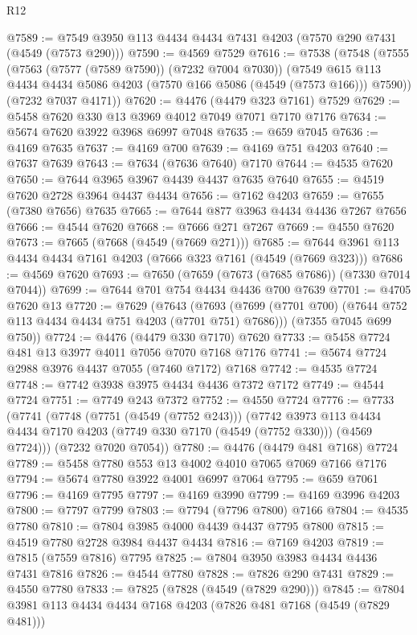 \begin{lexlean}{R12}
\begin{coremodule}
@7589 := @7549 @3950 @113 @4434 @4434 @7431 @4203 (@7570 @290 @7431 (@4549 (@7573 @290)))
@7590 := @4569 @7529
@7616 := @7538
    (@7548
      (@7555
        (@7563 (@7577 (@7589 @7590)) (@7232 @7004 @7030))
        (@7549 @615 @113 @4434 @4434 @5086 @4203 (@7570 @166 @5086 (@4549 (@7573 @166))) @7590))
      (@7232 @7037 @4171))
@7620 := @4476 (@4479 @323 @7161) @7529
@7629 := @5458 @7620 @330 @13 @3969 @4012 @7049 @7071 @7170 @7176
@7634 := @5674 @7620 @3922 @3968 @6997 @7048
@7635 := @659 @7045
@7636 := @4169 @7635
@7637 := @4169 @700
@7639 := @4169 @751 @4203
@7640 := @7637 @7639
@7643 := @7634 (@7636 @7640) @7170
@7644 := @4535 @7620
@7650 := @7644 @3965 @3967 @4439 @4437 @7635 @7640
@7655 := @4519 @7620 @2728 @3964 @4437 @4434
@7656 := @7162 @4203
@7659 := @7655 (@7380 @7656) @7635
@7665 := @7644 @877 @3963 @4434 @4436 @7267 @7656
@7666 := @4544 @7620
@7668 := @7666 @271 @7267
@7669 := @4550 @7620
@7673 := @7665 (@7668 (@4549 (@7669 @271)))
@7685 := @7644 @3961 @113 @4434 @4434 @7161 @4203 (@7666 @323 @7161 (@4549 (@7669 @323)))
@7686 := @4569 @7620
@7693 := @7650 (@7659 (@7673 (@7685 @7686)) (@7330 @7014 @7044))
@7699 := @7644 @701 @754 @4434 @4436 @700 @7639
@7701 := @4705 @7620 @13
@7720 := @7629
    (@7643
      (@7693 (@7699 (@7701 @700) (@7644 @752 @113 @4434 @4434 @751 @4203 (@7701 @751) @7686)))
      (@7355 @7045 @699 @750))
@7724 := @4476 (@4479 @330 @7170) @7620
@7733 := @5458 @7724 @481 @13 @3977 @4011 @7056 @7070 @7168 @7176
@7741 := @5674 @7724 @2988 @3976 @4437 @7055 (@7460 @7172) @7168
@7742 := @4535 @7724
@7748 := @7742 @3938 @3975 @4434 @4436 @7372 @7172
@7749 := @4544 @7724
@7751 := @7749 @243 @7372
@7752 := @4550 @7724
@7776 := @7733
    (@7741
      (@7748
        (@7751 (@4549 (@7752 @243)))
        (@7742
          @3973
          @113
          @4434
          @4434
          @7170
          @4203
          (@7749 @330 @7170 (@4549 (@7752 @330)))
          (@4569 @7724)))
      (@7232 @7020 @7054))
@7780 := @4476 (@4479 @481 @7168) @7724
@7789 := @5458 @7780 @553 @13 @4002 @4010 @7065 @7069 @7166 @7176
@7794 := @5674 @7780 @3922 @4001 @6997 @7064
@7795 := @659 @7061
@7796 := @4169 @7795
@7797 := @4169 @3990
@7799 := @4169 @3996 @4203
@7800 := @7797 @7799
@7803 := @7794 (@7796 @7800) @7166
@7804 := @4535 @7780
@7810 := @7804 @3985 @4000 @4439 @4437 @7795 @7800
@7815 := @4519 @7780 @2728 @3984 @4437 @4434
@7816 := @7169 @4203
@7819 := @7815 (@7559 @7816) @7795
@7825 := @7804 @3950 @3983 @4434 @4436 @7431 @7816
@7826 := @4544 @7780
@7828 := @7826 @290 @7431
@7829 := @4550 @7780
@7833 := @7825 (@7828 (@4549 (@7829 @290)))
@7845 := @7804 @3981 @113 @4434 @4434 @7168 @4203 (@7826 @481 @7168 (@4549 (@7829 @481)))

\end{coremodule}
\end{lexlean}
